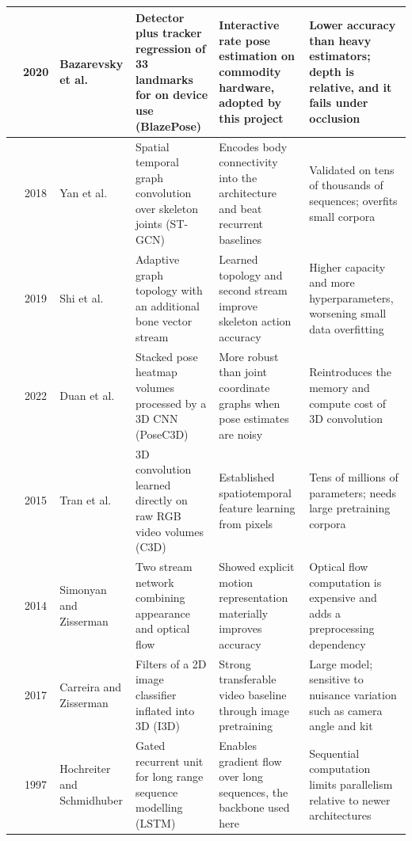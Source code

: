 \begin{longtable}{|c|c|>{\raggedright\arraybackslash}p{2.5cm}|
>{\raggedright\arraybackslash}p{2.9cm}|
>{\raggedright\arraybackslash}p{3.0cm}|
>{\raggedright\arraybackslash}p{3.0cm}|}
\cite{bazarevsky2020} & 2020 & Bazarevsky et al. &
Detector plus tracker regression of 33 landmarks for on device use (BlazePose) &
Interactive rate pose estimation on commodity hardware, adopted by this project &
Lower accuracy than heavy estimators; depth is relative, and it fails under occlusion \\ \hline

\cite{yan2018} & 2018 & Yan et al. &
Spatial temporal graph convolution over skeleton joints (ST-GCN) &
Encodes body connectivity into the architecture and beat recurrent baselines &
Validated on tens of thousands of sequences; overfits small corpora \\ \hline

\cite{shi2019} & 2019 & Shi et al. &
Adaptive graph topology with an additional bone vector stream &
Learned topology and second stream improve skeleton action accuracy &
Higher capacity and more hyperparameters, worsening small data overfitting \\ \hline

\cite{duan2022} & 2022 & Duan et al. &
Stacked pose heatmap volumes processed by a 3D CNN (PoseC3D) &
More robust than joint coordinate graphs when pose estimates are noisy &
Reintroduces the memory and compute cost of 3D convolution \\ \hline

\cite{tran2015} & 2015 & Tran et al. &
3D convolution learned directly on raw RGB video volumes (C3D) &
Established spatiotemporal feature learning from pixels &
Tens of millions of parameters; needs large pretraining corpora \\ \hline

\cite{simonyan2014} & 2014 & Simonyan and Zisserman &
Two stream network combining appearance and optical flow &
Showed explicit motion representation materially improves accuracy &
Optical flow computation is expensive and adds a preprocessing dependency \\ \hline

\cite{carreira2017} & 2017 & Carreira and Zisserman &
Filters of a 2D image classifier inflated into 3D (I3D) &
Strong transferable video baseline through image pretraining &
Large model; sensitive to nuisance variation such as camera angle and kit \\ \hline

\cite{hochreiter1997} & 1997 & Hochreiter and Schmidhuber &
Gated recurrent unit for long range sequence modelling (LSTM) &
Enables gradient flow over long sequences, the backbone used here &
Sequential computation limits parallelism relative to newer architectures \\ \hline


\end{longtable}
